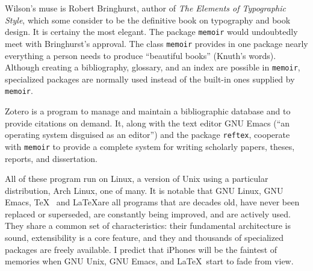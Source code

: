 \newpage
\begin{center}
  \textbf{\quad\quad{}\quad\quad{}\quad\quad{}\quad\quad{}}
\end{center}
Wilson's muse is Robert Bringhurst, author of \textit{The Elements of Typographic Style}, which some consider to be the definitive book on typography and book design. It is certainy the most elegant. The package \texttt{memoir} would undoubtedly meet with Bringhurst's approval.  The class \texttt{memoir} provides in one package nearly everything a person needs to produce ``beautiful books'' (Knuth's words). Although creating a bibliography, glossary, and an index are possible in \texttt{memoir}, specialized packages are normally used instead of the built-in ones supplied by \texttt{memoir}.
\begin{center}
  \textbf{\quad\quad{}\quad\quad{}\quad\quad{}\quad\quad{}}
\end{center}
Zotero is a program to manage and maintain a bibliographic database and to provide citations on demand. It, along with the text editor GNU Emacs (``an operating system disguised as an editor'') and the package \texttt{reftex}, cooperate with \texttt{memoir} to provide a complete system for writing scholarly papers, theses, reports, and dissertation.
\begin{center}
  \textbf{\quad\quad{}\quad\quad{}\quad\quad{}\quad\quad{}}
\end{center}
All of these program run on Linux, a version of Unix using a particular distribution, Arch Linux, one of many. It is notable that GNU Linux, GNU Emacs, \TeX  and \LaTeX are all programs that are decades old, have never been replaced or superseded, are constantly being improved, and are actively used. They share a common set of characteristics: their fundamental architecture is sound, extensibility is a core feature, and they and thousands of specialized packages are freely available. I predict that iPhones will be the faintest of memories when GNU Unix, GNU Emacs, and \LaTeX start to fade from view.
